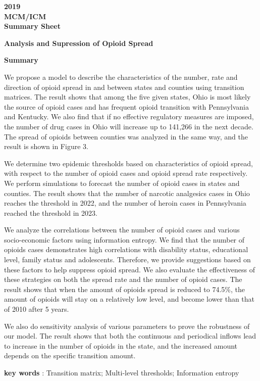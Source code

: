 \documentclass[13pt]{ctexart}
\begin{document}
{ \centering
	\fontsize{14}{10}\selectfont\textbf{2019}\\
	\fontsize{10}{10}\selectfont\textbf{MCM/ICM}\\
	\fontsize{10}{10}\selectfont\textbf{Summary Sheet}\par
}
\vspace{10pt}
{\centering\fontsize{18}{16}\selectfont\textbf{{Analysis and Supression of Opioid Spread}}
\vspace{10pt}

\fontsize{13}{10}\selectfont\textbf{{Summary}}\par}

\vspace{10pt}

\fontsize{13}{12.5}\selectfont
\thispagestyle{empty}
\begin{adjustwidth}{2cm}{2cm}
	\indent { }{ }{ }{ }{ }{ }We propose a model to describe the characteristics of the number, rate and direction of opioid spread in and between states and counties using transition matrices. The result shows that among the five given states, Ohio is most likely the source of opioid cases and has frequent opioid transition with Pennsylvania and Kentucky. We also find that if no effective regulatory measures are imposed, the number of drug cases in Ohio will increase up to 141,266 in the next decade. The spread of opioids between counties was analyzed in the same way, and the result is shown in Figure 3.
	
	We determine two epidemic thresholds based on characteristics of opioid spread, with respect to the number of opioid cases and opioid spread rate respectively. We perform simulations to forecast the number of opioid cases in states and counties. The result shows that the number of narcotic analgesics cases in Ohio reaches the threshold in 2022, and the number of heroin cases in Pennsylvania reached the threshold in 2023.
	
	We analyze the correlations between the number of opioid cases and various socio-economic factors using information entropy. We find that the number of opioids cases demonstrates high correlations with disability status, educational level, family status and adolescents. Therefore, we provide suggestions based on these factors to help suppress opioid spread. We also evaluate the effectiveness of these strategies on both the spread rate and the number of opioid cases. The result shows that when the amount of opioids spread is reduced to 74.5\%, the amount of opioids will stay on a relatively low level, and become lower than that of 2010 after 5 years.
	
	We also do sensitivity analysis of various parameters to prove the robustness of our model. The result shows that both the continuous and periodical inflows lead to increase in the number of opioids in the state, and the increased amount depends on the specific transition amount.
	
	\vspace{15pt}
	\textbf{key words} : Transition matrix; Multi-level thresholds; Information entropy
\end{adjustwidth} 
\end{document}
